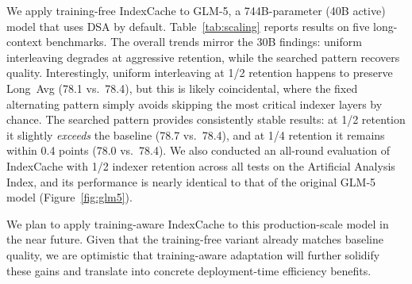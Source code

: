 \begin{table}[t]
\centering
\caption{%
    Preliminary results on GLM-5 (744B) with training-free IndexCache.
}
\label{tab:scaling}
\end{table}

We apply training-free IndexCache to GLM-5, a 744B-parameter (40B active) model that uses DSA by default. Table~\ref{tab:scaling} reports results on five long-context benchmarks.
The overall trends mirror the 30B findings: uniform interleaving degrades at aggressive retention, while the searched pattern recovers quality.
Interestingly, uniform interleaving at 1/2 retention happens to preserve Long~Avg (78.1 vs.\ 78.4), but this is likely coincidental, where the fixed alternating pattern simply avoids skipping the most critical indexer layers by chance.
The searched pattern provides consistently stable results: at 1/2 retention it slightly \emph{exceeds} the baseline (78.7 vs.\ 78.4), and at 1/4 retention it remains within 0.4 points (78.0 vs.\ 78.4).
We also conducted an all-round evaluation of IndexCache with 1/2 indexer retention across all tests on the Artificial Analysis Index, and its performance is nearly identical to that of the original GLM‑5 model (Figure~\ref{fig:glm5}).

We plan to apply training-aware IndexCache to this production-scale model in the near future. Given that the training-free variant already matches baseline quality, we are optimistic that training-aware adaptation will further solidify these gains and translate into concrete deployment-time efficiency benefits.
